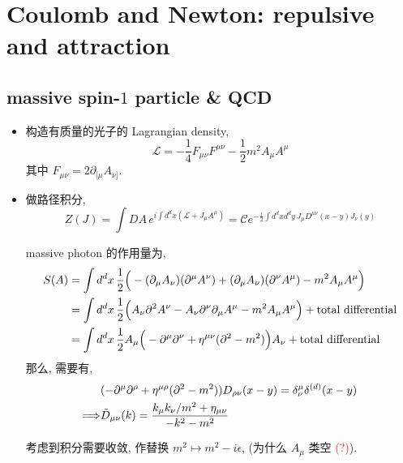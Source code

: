 \chapter{Coulomb and Newton: repulsive and attraction}
\section{massive spin-\texorpdfstring{$1$}{1} particle \& QCD}
\begin{itemize}
	\item 构造有质量的光子的 Lagrangian density,
	\begin{equation}
		\mathcal{L} = - \frac{1}{4} F_{\mu \nu} F^{\mu \nu} - \frac{1}{2} m^2 A_\mu A^\mu
	\end{equation}
	其中 $F_{\mu \nu} = 2 \partial_{[\mu} A_{\nu]}$.
	
	\item 做路径积分,
	\begin{equation}
		Z(J) = \int DA \, e^{i \int d^d x (\mathcal{L} + J_\mu A^\mu)} = \mathcal{C} e^{- \frac{i}{2} \int d^d x d^d y \, J_\mu D^{\mu \nu}(x - y) J_\nu(y)}
	\end{equation}
	
	\begin{tcolorbox}[title=calculation:]
		massive photon 的作用量为,
		\begin{align}
			S(A) &= \int d^d x \, \frac{1}{2} \Big( - (\partial_\mu A_\nu) (\partial^\mu A^\nu) + (\partial_\mu A_\nu) (\partial^\nu A^\mu) - m^2 A_\mu A^\mu \Big) \notag \\
			&= \int d^d x \, \frac{1}{2} \Big( A_\nu \partial^2 A^\nu - A_\nu \partial^\nu \partial_\mu A^\mu - m^2 A_\mu A^\mu \Big) + \text{total differential} \notag \\
			&= \int d^d x \, \frac{1}{2} A_\mu \Big( - \partial^\mu \partial^\nu + \eta^{\mu \nu} (\partial^2 - m^2) \Big) A_\nu + \text{total differential}
		\end{align}
		那么, 需要有,
		\begin{align}
			& (- \partial^\mu \partial^\rho + \eta^{\mu \rho} (\partial^2 - m^2)) D_{\rho \nu}(x - y) = \delta^\mu_\nu \delta^{(d)}(x - y) \notag \\
			\Longrightarrow & \tilde{D}_{\mu \nu}(k) = \frac{k_\mu k_\nu / m^2 + \eta_{\mu \nu}}{- k^2 - m^2}
		\end{align}
	\end{tcolorbox}
	
	考虑到积分需要收敛, 作替换 $m^2 \mapsto m^2 - i \epsilon$, (为什么 $A_\mu$ 类空 \textcolor{red}{(?)}).
	

\end{itemize}
